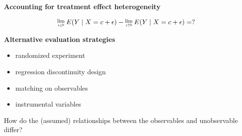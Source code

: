 \begin{frame}\textbf{Accounting for treatment effect heterogeneity}\vspace{0.3cm}

\begin{align*}
\Lim{\epsilon \downarrow 0} E(Y\mid X = c + \epsilon) -
\Lim{\epsilon \uparrow 0} E(Y\mid X = c + \epsilon) = ? 
\end{align*}

\end{frame}
\begin{frame}\textbf{Alternative evaluation strategies}\vspace{0.3cm}

\begin{itemize}\setlength\itemsep{1em}
\item randomized experiment
\item regression discontinuity design
\item matching on observables
\item instrumental variables\vspace{0.3cm}
\end{itemize}

How do the (assumed) relationships between the observables and unobservable differ?

\end{frame}
\begin{frame}

\begin{figure}[htp]\centering
{}
\end{figure}

\end{frame}

